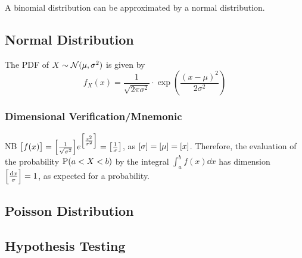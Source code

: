 A binomial distribution can be approximated by a normal distribution.

\subsection{Normal Distribution}


The PDF of \(X \sim \operatorname{\mathcal{N}}(\mu, \sigma^2)\) is given by
\begin{equation*}
f_X(x) = \frac{1}{\sqrt{2\pi\sigma^2}} \cdot
    \exp(\frac{(x - \mu)^2}{2\sigma^2})
\end{equation*}

\subsubsection{Dimensional Verification/Mnemonic}

NB \(\bqty{f(x)} =
    \bqty{\frac 1{\sqrt{\sigma^2}}}
    e^{\bqty{\frac{x^2}{\sigma^2}}}
  = \bqty{\frac 1\sigma}\), as
\(\bqty{\sigma} = \bqty{\mu} = \bqty{x}\). Therefore, the
evaluation of the probability \(\operatorname{\mathrm P}(a < X < b)\) by the integral
\(\int_a^bf(x) \dd{x}\) has dimension
\(\bqty{\frac{\dd{x}}{\sigma}} = 1\), as expected for a probability.

\subsection{Poisson Distribution}


\subsection{Hypothesis Testing}

